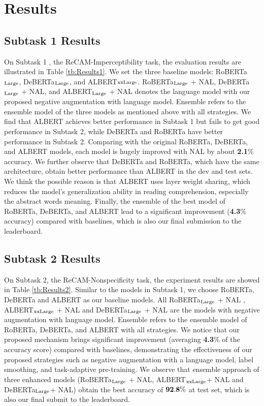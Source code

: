 \documentclass[11pt,a4paper]{article}
\begin{document}
\section{Results}

\subsection{Subtask 1 Results}
On Subtask 1 , the ReCAM-Imperceptibility task, the evaluation results are illustrated in Table \ref{tb:Results1}.
We set the three baseline models: RoBERTa$_{\mbox{\scriptsize Large}}$, DeBERTa$_{\mbox{\scriptsize Large}}$, and ALBERT${\mbox{\scriptsize xxLarge}}$.
RoBERTa$_{\mbox{\scriptsize Large}}$ + NAL, DeBERTa$_{\mbox{\scriptsize Large}}$ + NAL, and ALBERT$_{\mbox{\scriptsize Large}}$ + NAL denotes the language model with our proposed negative augmentation with language model.
Ensemble refers to the ensemble model of the three models as mentioned above with all strategies.
We find that ALBERT achieves better performance in Subtask 1 but fails to get good performance in Subtask 2, while DeBERTa and RoBERTa have better performance in Subtask 2.
Comparing with the original RoBERTa, DeBERTa, and ALBERT models, each model is hugely improved with NAL by about \textbf{2.1}\% accuracy.
We further observe that DeBERTa and RoBERTa, which have the same architecture, obtain better performance than ALBERT in the dev and test sets.
We think the possible reason is that ALBERT uses layer weight sharing, which reduces the model's generalization ability in reading comprehension, especially the abstract words meaning.
Finally, the ensemble of the best model of RoBERTa, DeBERTa, and ALBERT lead to a significant improvement (\textbf{4.3}\% accuracy) compared with baselines, which is also our final submission to the leaderboard.

\subsection{Subtask 2 Results}
On Subtask 2, the ReCAM-Nonspecificity task, the experiment results are showed in Table \ref{tb:Results2}.
Similar to the models in Subtask 1, we choose RoBERTa, DeBERTa and ALBERT as our baseline models.
All RoBERTa$_{\mbox{\scriptsize Large}}$ + NAL , ALBERT$_{\mbox{\scriptsize xxLarge}}$ + NAL and DeBERTa$_{\mbox{\scriptsize Large}}$ + NAL 
are the models with negative augmentation with language model.
Ensemble refers to the ensemble model of RoBERTa, DeBERTa, and ALBERT with all strategies.
We notice that our proposed mechanism brings significant improvement  (averaging \textbf{4.3}\% of the accuracy score) compared with baselines, demonstrating the effectiveness of our proposed strategies such as negative augmentation with a language model, label smoothing, and task-adaptive pre-training.
We observe that ensemble approach of three enhanced models (RoBERTa$_{\mbox{\scriptsize Large}}$ + NAL, ALBERT$_{\mbox{\scriptsize xxLarge}}$+ NAL and DeBERTa$_{\mbox{\scriptsize Large}}$+ NAL) obtain the best accuracy of $\bf 92.8\%$ at test set, which is also our final submit to the leaderboard.
\end{document}
